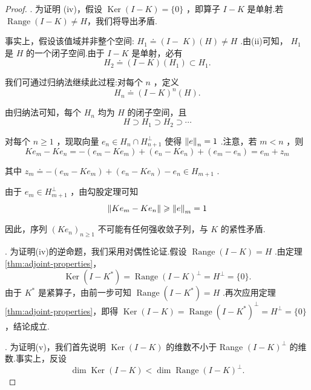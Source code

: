 \begin{proof}
. 为证明 (iv)，假设 $\operatorname{Ker}\left( {I - K}\right)  = \{ 0\}$ ，即算子 $I - K$ 是单射.若 $\operatorname{Range}\left( {I - K}\right)  \neq  H$，我们将导出矛盾.

事实上，假设该值域并非整个空间: ${H}_{1} \doteq  (I - \; K)\left( H\right)  \neq  H$ .由(ii)可知， ${H}_{1}$ 是 $H$ 的一个闭子空间.由于 $I - K$ 是单射，必有
\[
{H}_{2} \doteq  \left( {I - K}\right) \left( {H}_{1}\right)  \subset  {H}_{1}.
\]

我们可通过归纳法继续此过程:对每个 $n$ ，定义
\[
{H}_{n} \doteq  {\left( I - K\right) }^{n}\left( H\right) .
\]

由归纳法可知，每个 ${H}_{n}$ 均为 $H$ 的闭子空间，且
\[
H \supset  {H}_{1} \supset  {H}_{2} \supset  \cdots
\]

对每个 $n \geq  1$ ，现取向量 ${e}_{n} \in  {H}_{n} \cap  {H}_{n + 1}^{ \bot  }$ 使得 $\norm{e}_{n} = 1$ .注意，若 $m < n$ ，则
\[
K{e}_{m} - K{e}_{n} =  - \left( {{e}_{m} - K{e}_{m}}\right)  + \left( {{e}_{n} - K{e}_{n}}\right)  + \left( {{e}_{m} - {e}_{n}}\right)  = {e}_{m} + {z}_{m}
\]

其中 ${z}_{m} \doteq   - \left( {{e}_{m} - K{e}_{m}}\right)  + \left( {{e}_{n} - K{e}_{n}}\right)  - {e}_{n} \in  {H}_{m + 1}$ .

由于 ${e}_{m} \in  {H}_{m + 1}^{ \bot  }$ ，由勾股定理可知
\[
\norm{K{e}_{m} - K{e}_{n}} \geqslant  \norm{e}_{m} = 1
\]

因此，序列 ${\left( K{e}_{n}\right) }_{n \geq  1}$ 不可能有任何强收敛子列，与 $K$ 的紧性矛盾.

. 为证明(iv)的逆命题，我们采用对偶性论证.假设 $\operatorname{Range}\left( {I - K}\right)  = H$ .由定理\ref{thm:adjoint-properties}，
\[
\operatorname{Ker}\left( {I - {K}^{ * }}\right)  = \operatorname{Range}{\left( I - K\right) }^{ \bot  } = {H}^{ \bot  } = \{ 0\} .
\]
由于 ${K}^{ * }$ 是紧算子，由前一步可知 $\operatorname{Range}\left( {I - {K}^{ * }}\right)  = H$ .再次应用定理\ref{thm:adjoint-properties}，即得 $\operatorname{Ker}\left( {I - K}\right)  = \operatorname{Range}{\left( I - {K}^{ * }\right) }^{ \bot  } = {H}^{ \bot  } = \{ 0\}$ ，结论成立.

. 为证明(v)，我们首先说明 $\operatorname{Ker}\left( {I - K}\right)$ 的维数不小于 Range ${\left( I - K\right) }^{ \bot  }$ 的维数.事实上，反设
\begin{equation}\tag{6.3}\label{eq:fredholm-dim-inequality}
\dim \operatorname{Ker}\left( {I - K}\right)  < \dim \operatorname{Range}{\left( I - K\right) }^{ \bot  }.
\end{equation}


\end{proof}
